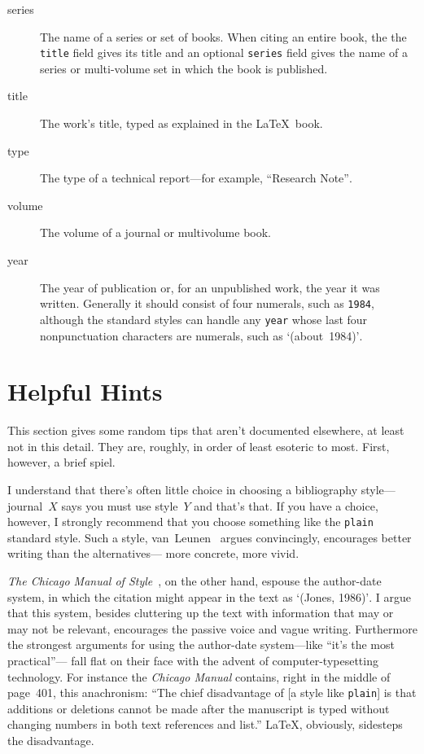 \begin{description}
\item[series\hfill]
The name of a series or set of books.
When citing an entire book, the the \hbox{\tt title} field
gives its title and an optional \hbox{\tt series} field gives the
name of a series or multi-volume set
in which the book is published.

\item[title\hfill]
The work's title, typed as explained in the \LaTeX\ book.

\item[type\hfill]
The type of a technical report---for example,
``Research Note''$\!$.

\item[volume\hfill]
The volume of a journal or multivolume book.

\item[year\hfill]
The year of publication or, for
an unpublished work, the year it was written.
Generally it should consist of four numerals, such as {\tt 1984},
although the standard styles can handle any {\tt year} whose
last four nonpunctuation characters are numerals,
such as `\hbox{(about 1984)}'$\!$.

\end{description}


\section{Helpful Hints}
\label{odds-and-ends}

This section gives some random tips
that aren't documented elsewhere,
at least not in this detail.
They are, roughly, in order
of least esoteric to most.
First, however, a brief spiel.

I understand that there's often little choice in choosing
a bibliography style---journal~$X$ says you must use style~$Y$
and that's that.
If you have a choice, however, I strongly recommend that you
choose something like the {\tt plain} standard style.
Such a style, van~Leunen~\cite{van-leunen} argues convincingly,
encourages better writing than the alternatives---%
more concrete, more vivid.

{\em The Chicago Manual of Style\/}~\cite{chicago},
on the other hand,
espouse the author-date system,
in which the citation might appear in the text as `(Jones, 1986)'$\!$.
I argue that this system,
besides cluttering up the
text with information that may or may not be relevant,
encourages the passive voice and vague writing.
Furthermore the strongest arguments for
using the author-date system---like ``it's the most practical''---%
fall flat on their face with the advent
of computer-typesetting technology.
For instance the {\em Chicago Manual\/} contains,
right in the middle of page~401, this anachronism:
``The chief disadvantage of [a style like {\tt plain}] is that additions
or deletions cannot be made after the manuscript is typed without changing
numbers in both text references and list.''
\LaTeX, obviously, sidesteps the disadvantage.

